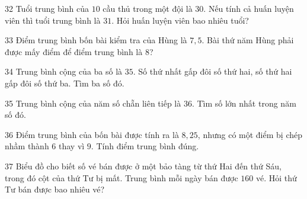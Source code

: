 \gap
\begin{probbox}{32}{}
Tuổi trung bình của $10$ cầu thủ trong một đội là $30$. Nếu tính cả huấn luyện viên thì tuổi trung bình là $31$. Hỏi huấn luyện viên bao nhiêu tuổi?
\end{probbox}
\gap
\begin{probbox}{33}{}
Điểm trung bình bốn bài kiểm tra của Hùng là $7{,}5$. Bài thứ năm Hùng phải được mấy điểm để điểm trung bình là $8$?
\end{probbox}
\gap
\begin{probbox}{34}{}
Trung bình cộng của ba số là $35$. Số thứ nhất gấp đôi số thứ hai, số thứ hai gấp đôi số thứ ba. Tìm ba số đó.
\end{probbox}
\gap
\begin{probbox}{35}{}
Trung bình cộng của năm số chẵn liên tiếp là $36$. Tìm số lớn nhất trong năm số đó.
\end{probbox}
\gap
\begin{probbox}{36}{}
Điểm trung bình của bốn bài được tính ra là $8{,}25$, nhưng có một điểm bị chép nhầm thành $6$ thay vì $9$. Tính điểm trung bình đúng.
\end{probbox}
\gap
\needspace{8.5cm}
\begin{probbox}{37}{}
Biểu đồ cho biết số vé bán được ở một bảo tàng từ thứ Hai đến thứ Sáu, trong đó cột của thứ Tư bị mất. Trung bình mỗi ngày bán được $160$ vé. Hỏi thứ Tư bán được bao nhiêu vé?
\begin{center}
\end{center}
\end{probbox}
